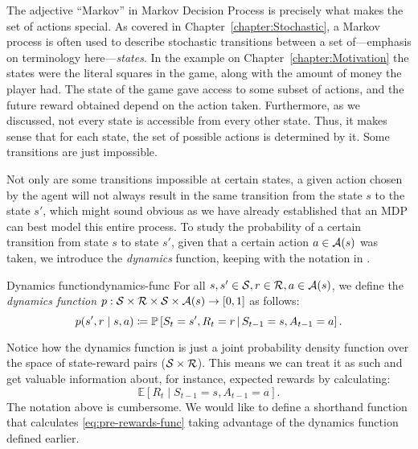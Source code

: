 
The adjective ``Markov'' in Markov Decision Process is precisely what makes the
set of actions special. As covered in Chapter~\ref{chapter:Stochastic}, a Markov
process is often used to describe stochastic transitions between a set
of---emphasis on terminology here---\textit{states}. In the example on
Chapter~\ref{chapter:Motivation} the states were the literal squares in the
game, along with the amount of money the player had. The state of the game gave
access to some subset of actions, and the future reward obtained depend on the
action taken. Furthermore, as we discussed, not every state is accessible from
every other state.  Thus, it makes sense that for each state, the set of possible
actions is determined by it. Some transitions are just impossible.

Not only are some transitions impossible at certain states, a given action
chosen by the agent will not always result in the same transition from the state
$s$ to the state $s'$, which might sound obvious as we have already established
that an MDP can best model this entire process. To study the probability
of a certain transition from state $s$ to state $s'$, given that a certain action
$a \in \mathcal{A}(s)$ was taken, we introduce the \textit{dynamics} function,
keeping with the notation in \cite{SuttonBarto}.

\begin{dfn}{Dynamics function}{dynamics-func}
	For all $s, s' \in \mathcal{S}, r \in \mathcal{R}, a \in 
	\mathcal{A}(s)$, we define the \emph{dynamics function} $p: 
	\mathcal{S} \times \mathcal{R} \times \mathcal{S} \times \mathcal{A}(s) 
	\to [0, 1]$ as follows:
	\[
		p(s', r \mid s, a) \coloneqq \mathbb{P}\left[S_t = s', R_t = r 
		\,\middle\vert\, S_{t-1} = s, A_{t-1} = a\right].
	\]
\end{dfn}

Notice how the dynamics function is just a joint probability density function
over the space of state-reward pairs ($\mathcal{S} \times \mathcal{R}$). This means we
can treat it as such and get valuable information about, for instance, expected
rewards by calculating:
\begin{equation}
	\label{eq:pre-rewards-func}
	\mathbb{E} \left[ R_t \mid S_{t-1} = s, A_{t-1} = a \right].
\end{equation}
The notation above is cumbersome. We would like to define a shorthand function
that calculates \eqref{eq:pre-rewards-func} taking advantage of the dynamics
function defined earlier.

